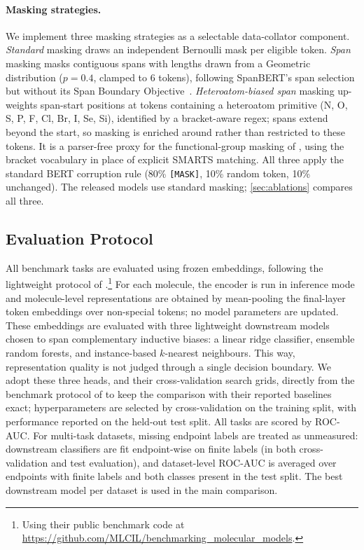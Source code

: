 \documentclass[11pt,a4paper]{article}
\begin{document}
\paragraph{Masking strategies.}
We implement three masking strategies as a selectable data-collator component.
\emph{Standard} masking draws an independent Bernoulli mask per eligible token.
\emph{Span} masking masks contiguous spans with lengths drawn from a Geometric
distribution ($p=0.4$, clamped to 6 tokens), following SpanBERT's span
selection but without its Span Boundary
Objective~\citep{joshiSpanBERTImprovingPreTraining2020}.
\emph{Heteroatom-biased span} masking up-weights span-start positions at \ape{}
tokens containing a heteroatom primitive (N, O, S, P, F, Cl, Br, I, Se, Si),
identified by a bracket-aware \selfies{} regex; spans extend beyond the start,
so masking is enriched around rather than restricted to these tokens. It is a
parser-free proxy for the functional-group masking of
\citet{pengPretrainedMolecularLanguage2025}, using the \ape{} bracket
vocabulary in place of explicit SMARTS matching. All three apply the standard
BERT corruption rule (80\% \texttt{[MASK]}, 10\% random token, 10\% unchanged).
The released models use standard masking; \cref{sec:ablations} compares all
three.

\subsection{Evaluation Protocol}
\label{sec:eval-protocol}

All benchmark tasks are evaluated using frozen \model{} embeddings, following
the lightweight protocol of \citet{praskiBenchmarkingPretrainedMolecular2025}.\footnote{%
Using their public benchmark code at
\url{https://github.com/MLCIL/benchmarking_molecular_models}.}
For each molecule, the encoder is run in inference mode and molecule-level
representations are obtained by mean-pooling the final-layer token embeddings
over non-special \selfies{} tokens; no model parameters are updated. These
embeddings are evaluated with three lightweight downstream models chosen to
span complementary inductive biases: a linear ridge classifier, ensemble
random forests, and instance-based $k$-nearest neighbours. This way,
representation quality is not judged through a single decision boundary. We
adopt these three heads, and their cross-validation search grids, directly from
the benchmark protocol of \citet{praskiBenchmarkingPretrainedMolecular2025} to
keep the comparison with their reported baselines exact; hyperparameters are
selected by cross-validation on the training split, with performance reported
on the held-out test split. All tasks are scored by ROC-AUC. For multi-task
datasets, missing endpoint labels are treated as unmeasured: downstream
classifiers are fit endpoint-wise on finite labels (in both cross-validation
and test evaluation), and dataset-level ROC-AUC is averaged over endpoints with
finite labels and both classes present in the test split. The best downstream
model per dataset is used in the main comparison.
\end{document}
